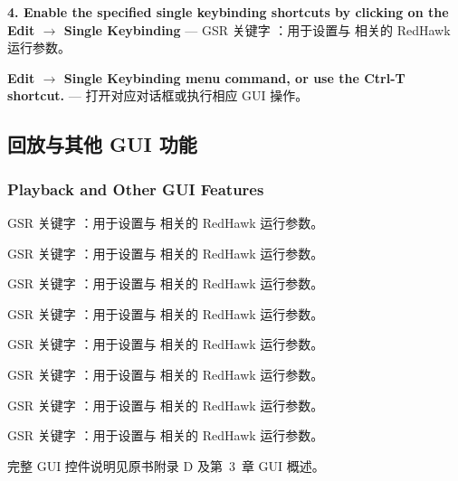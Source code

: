 \textbf{4.   Enable the specified single keybinding shortcuts by clicking on the Edit $\rightarrow$ Single Keybinding} — GSR 关键字 ：用于设置与  相关的 RedHawk 运行参数。

\textbf{Edit $\rightarrow$ Single Keybinding menu command, or use the Ctrl-T shortcut.} — 打开对应对话框或执行相应 GUI 操作。

\subsection{回放与其他 GUI 功能}
\subsubsection*{Playback and Other GUI Features}

GSR 关键字 ：用于设置与  相关的 RedHawk 运行参数。

GSR 关键字 ：用于设置与  相关的 RedHawk 运行参数。

GSR 关键字 ：用于设置与  相关的 RedHawk 运行参数。

GSR 关键字 ：用于设置与  相关的 RedHawk 运行参数。

GSR 关键字 ：用于设置与  相关的 RedHawk 运行参数。

GSR 关键字 ：用于设置与  相关的 RedHawk 运行参数。

GSR 关键字 ：用于设置与  相关的 RedHawk 运行参数。

GSR 关键字 ：用于设置与  相关的 RedHawk 运行参数。

\begin{seeAlsoBox}
完整 GUI 控件说明见原书附录 D 及第~3~章 GUI 概述。
\end{seeAlsoBox}
